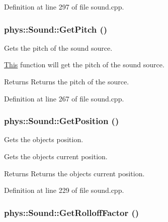 Definition at line 297 of file sound.cpp.

\hypertarget{classphys_1_1Sound_ae28ce63dc22eb8a80edf9dbfe8ea64cd}{
\subsubsection[{GetPitch}]{ phys::Sound::GetPitch ()}}
\label{dc/d2f/classphys_1_1Sound_ae28ce63dc22eb8a80edf9dbfe8ea64cd}


Gets the pitch of the sound source. 

\hyperlink{structThis}{This} function will get the pitch of the sound source. \begin{DoxyReturn}{Returns}
Returns the pitch of the source. 
\end{DoxyReturn}


Definition at line 267 of file sound.cpp.

\hypertarget{classphys_1_1Sound_a6d7097965cb87491896f688a8ef12d45}{
\subsubsection[{GetPosition}]{ phys::Sound::GetPosition ()}}
\label{dc/d2f/classphys_1_1Sound_a6d7097965cb87491896f688a8ef12d45}


Gets the objects position. 

Gets the objects current position. \begin{DoxyReturn}{Returns}
Returns the objects current position. 
\end{DoxyReturn}


Definition at line 229 of file sound.cpp.

\hypertarget{classphys_1_1Sound_ab87182be43ed55e44acf7143a7b08213}{
\subsubsection[{GetRolloffFactor}]{ phys::Sound::GetRolloffFactor ()}}
\label{dc/d2f/classphys_1_1Sound_ab87182be43ed55e44acf7143a7b08213}


